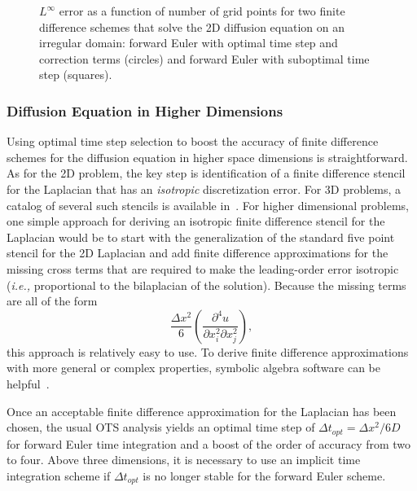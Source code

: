 \documentclass[fleqn,12pt,twoside]{article}
\newcommand{\beq}{\begin{equation}}
\newcommand{\eeq}{\end{equation}}
\def\dt{\Delta t}
\def\dx{\Delta x}
\def\ie{\emph{i.e., }}
\begin{document}
\begin{figure}[tb]
\begin{center}
\caption{$L^\infty$ error as a function of number of grid points for two
finite difference schemes that solve the 2D diffusion equation on an 
irregular domain: forward Euler with optimal time step and correction 
terms (circles) and forward Euler with suboptimal time step (squares).  
}
\label{fig:diffusion_eqn_2d_starfish_error}
\end{center}
\end{figure}


\subsubsection{Diffusion Equation in Higher Dimensions}
Using optimal time step selection to boost the accuracy of finite difference
schemes for the diffusion equation in higher space dimensions is 
straightforward.  As for the 2D problem, the key step is identification of a 
finite difference stencil for the Laplacian that has an \emph{isotropic} 
discretization error.  For 3D problems, a catalog of several such stencils is 
available in~\cite{patra_2005}.   For higher dimensional problems, one simple
approach for deriving an isotropic finite difference stencil for the Laplacian
would be to start with the generalization of the standard five point stencil
for the 2D Laplacian and add finite difference approximations for the missing 
cross terms that are required to make the leading-order error isotropic 
(\ie proportional to the bilaplacian of the solution).  Because the missing 
terms are all of the form 
\beq
\frac{\dx^2}{6} \left(\frac{\partial^4 u}{\partial x_i^2 \partial x_j^2}\right),
\eeq
this approach is relatively easy to use.  To derive finite difference 
approximations with more general or complex properties, symbolic algebra 
software can be helpful~\cite{patra_2005,gupta_1998}.  

Once an acceptable finite difference approximation for the Laplacian has been 
chosen, the usual OTS analysis yields an optimal time step of 
$\dt_{opt} = \dx^2/6D$ for forward Euler time integration and a boost of the 
order of accuracy from two to four.  Above three dimensions, it is necessary 
to use an implicit time integration scheme if $\dt_{opt}$ is no longer 
stable for the forward Euler scheme.
\end{document}
